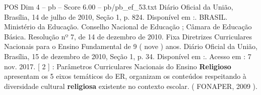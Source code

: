 \begin{textsample}{POS Dim 4 – pb – Score 6.00 – pb/pb\_ef\_53.txt}
Diário Oficial da União, Brasília, 14 de julho de 2010, Seção 1, p. 824.
Disponível em :.
BRASIL.
Ministério da Educação.
Conselho Nacional de Educação ; Câmara de Educação Básica.
Resolução nº 7, de 14 de dezembro de 2010.
Fixa Diretrizes Curriculares Nacionais para o Ensino Fundamental de 9 ( nove ) anos.
Diário Oficial da União, Brasília, 15 de dezembro de 2010, Seção 1, p. 34.
Disponível em :.
Acesso em : 7 nov. 2017. [ 2 ] : Parâmetros Curriculares Nacionais do Ensino \textbf{Religioso} apresentam os 5 eixos temáticos do ER, organizam os conteúdos respeitando à diversidade cultural \textbf{religiosa} existente no contexto escolar. ( FONAPER, 2009 ).

\end{textsample}

